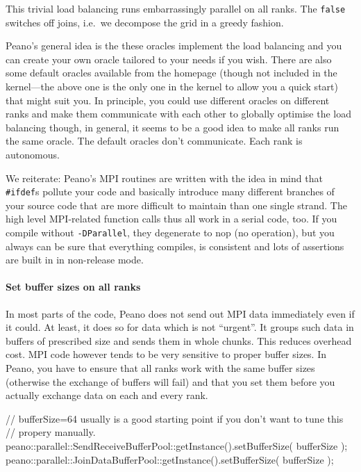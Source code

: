 \noindent
This trivial load balancing runs embarrassingly parallel on all ranks. 
The \texttt{false} switches off joins, i.e.~we decompose the grid in a greedy
fashion.

Peano's general idea is the these oracles implement the load balancing and you
can create your own oracle tailored to your needs if you wish.
There are also some default oracles available from the homepage (though not
included in the kernel---the above one is the only one in the kernel to allow
you a quick start) that might suit you.
In principle, you could use different oracles on different ranks and make them
communicate with each other to globally optimise the load balancing
though, in general, it seems to be a good idea to make all ranks 
run the same oracle.
The default oracles don't communicate. 
Each rank is autonomous.
 
\begin{remark}
We reiterate:
Peano's MPI routines are written with the idea in mind that \texttt{#ifdef}s
pollute your code and basically introduce many different branches of your source
code that are more difficult to maintain than one single strand. The high level
MPI-related function calls thus all work in a serial code, too. If you
compile without \texttt{-DParallel}, they degenerate to nop (no operation), but
you always can be sure that everything compiles, is consistent and lots of
assertions are built in in non-release mode.
\end{remark}



\paragraph{Set buffer sizes on all ranks}
In most parts of the code, Peano does not send out MPI data immediately even 
if it could.
At least, it does so for data which is not ``urgent''.
It groups such data in buffers of prescribed size and sends them in whole
chunks.
This reduces overhead cost.
MPI code however tends to be very sensitive to proper buffer
sizes.
In Peano, you have to ensure that all ranks work with the same buffer sizes
(otherwise the exchange of buffers will fail) and that you set them before you
actually exchange data on each and every rank. 

\begin{code}
// bufferSize=64 usually is a good starting point if you don't want to tune this
// propery manually.
peano::parallel::SendReceiveBufferPool::getInstance().setBufferSize( bufferSize );
peano::parallel::JoinDataBufferPool::getInstance().setBufferSize( bufferSize );
\end{code}

